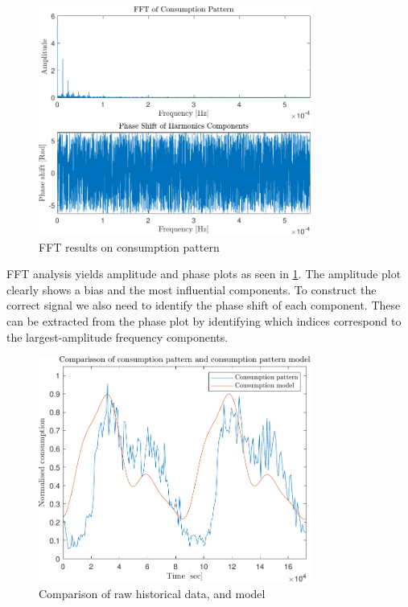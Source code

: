\begin{figure}[h!]
	\centering
	\includegraphics[width=0.8\textwidth]{Pictures/FFT.pdf}
	
	\caption{FFT results on consumption pattern}
	\label{fig:FFT}
\end{figure}

FFT analysis yields amplitude and phase plots as seen in \cref{fig:FFT}. The amplitude plot clearly shows a bias and the most influential components. To construct the correct signal we also need to identify the phase shift of each component. These can be extracted from the phase plot by identifying which indices correspond to the largest-amplitude frequency components.

\begin{figure}[h!]
	\centering
	\includegraphics[width=0.8\textwidth]{Pictures/Comparisson.pdf}
	
	\caption{Comparison of raw historical data, and model}
	\label{fig:Comparison}
\end{figure}

